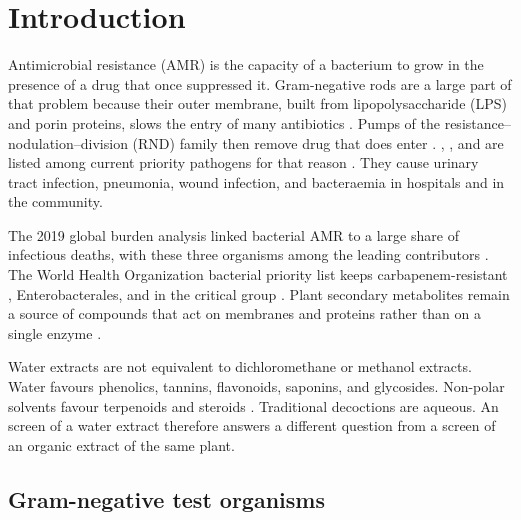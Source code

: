 
\chapter{Introduction}\label{ch:introduction}

Antimicrobial resistance (AMR) is the capacity of a bacterium to grow in the presence of a drug that once suppressed it. Gram-negative rods are a large part of that problem because their outer membrane, built from lipopolysaccharide (LPS) and porin proteins, slows the entry of many antibiotics \citep{nikaido2003molecular,pages2008porin}. Pumps of the resistance--nodulation--division (RND) family then remove drug that does enter \citep{poole2005efflux}. , , and  are listed among current priority pathogens for that reason \citep{amrcollaborators2022global,who2024bacterial}. They cause urinary tract infection, pneumonia, wound infection, and bacteraemia in hospitals and in the community.

The 2019 global burden analysis linked bacterial AMR to a large share of infectious deaths, with these three organisms among the leading contributors \citep{amrcollaborators2022global}. The World Health Organization bacterial priority list keeps carbapenem-resistant , Enterobacterales, and  in the critical group \citep{who2024bacterial}. Plant secondary metabolites remain a source of compounds that act on membranes and proteins rather than on a single enzyme \citep{cowan1999plant,jubair2021review}.

Water extracts are not equivalent to dichloromethane or methanol extracts. Water favours phenolics, tannins, flavonoids, saponins, and glycosides. Non-polar solvents favour terpenoids and steroids \citep{cowan1999plant,azwanida2015review}. Traditional decoctions are aqueous. An \invitro{} screen of a water extract therefore answers a different question from a screen of an organic extract of the same plant.

\section{Gram-negative test organisms}

